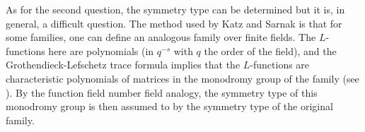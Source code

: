       As for the second question, the symmetry type can be determined but it is, in general, a difficult question. The method used by Katz and Sarnak is that for some families, one can define an analogous family over finite fields. The $L$-functions here are polynomials (in $q^{-s}$ with $q$ the order of the field), and the Grothendieck-Lefschetz trace formula implies that the $L$-functions are characteristic polynomials of matrices in the monodromy group of the family (see ). By the function field number field analogy, the symmetry type of this monodromy group is then assumed to by the symmetry type of the original family.
      \fi